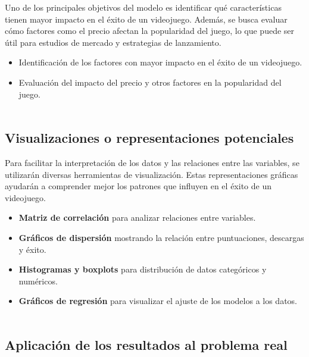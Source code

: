 \documentclass[titlepage,a4paper]{article}
\begin{document}
Uno de los principales objetivos del modelo es identificar qué características tienen mayor impacto en el éxito de un videojuego. Además, se busca evaluar cómo factores como el precio afectan la popularidad del juego, lo que puede ser útil para estudios de mercado y estrategias de lanzamiento. \\

\begin{itemize}
    \item Identificación de los factores con mayor impacto en el éxito de un videojuego. \\

    \item Evaluación del impacto del precio y otros factores en la popularidad del juego.\\\\
\end{itemize}

\subsection{Visualizaciones o representaciones potenciales}

Para facilitar la interpretación de los datos y las relaciones entre las variables, se utilizarán diversas herramientas de visualización. Estas representaciones gráficas ayudarán a comprender mejor los patrones que influyen en el éxito de un videojuego. \\

\begin{itemize}
    \item \textbf{Matriz de correlación} para analizar relaciones entre variables. \\

    \item \textbf{Gráficos de dispersión} mostrando la relación entre puntuaciones, descargas y éxito. \\

    \item \textbf{Histogramas y boxplots} para distribución de datos categóricos y numéricos. \\

    \item \textbf{Gráficos de regresión} para visualizar el ajuste de los modelos a los datos. \\\\
\end{itemize}

\subsection{Aplicación de los resultados al problema real}
\end{document}
